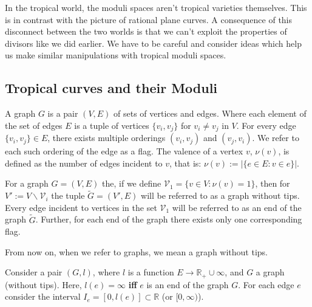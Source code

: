 \par In the tropical world, the moduli spaces aren't tropical varieties themselves. 
This is in contrast with the picture of rational plane curves.
A consequence of this disconnect between the two worlds is that we can't exploit the properties of divisors like we did earlier.
We have to be careful and consider ideas which help us make similar manipulations with tropical moduli spaces.

\subsection{Tropical curves and their Moduli}

\begin{definition}[Graphs]
    A graph $G$ is a pair $(V,E)$ of sets of vertices and edges.
    Where each element of the set of edges $E$ is a tuple of vertices $\{v_{i},v_{j}\}$ for $v_{i} \neq v_{j}$ in $V$. 
    For every edge $\{v_{i},v_{j}\} \in E$, there exists multiple orderings $(v_{i},v_{j})$ and $(v_{j},v_{i})$. We refer to each such ordering of the edge as a flag.
    The valence of a vertex $v$, $\nu(v)$, is defined as the number of edges incident to $v$, that is: $\nu(v):=|\{e \in E: v\in e\}|$.
\end{definition}

\begin{definition}
    For a graph $G = (V,E)$ the, if we define $\mathcal{V}_{1} = \{v \in V: \nu(v) =1  \}$, then for $V':= V\backslash \mathcal{V}_{i}$ the tuple $\tilde{G} = (V',E)$ will be referred to as a graph without tips. 
    Every edge incident to vertices in the set $\mathcal{V}_{1}$ will be referred to as an end of the graph $\tilde G$.
    Further, for each end of the graph there exists only one corresponding flag.
\end{definition}

\begin{remark}
    From now on, when we refer to graphs, we mean a graph without tips.
\end{remark}

\begin{definition}
    Consider a pair $(G,l)$, where $l$ is a function $E \to \mathbb{R}_{+} \cup \infty$, and $G$ a graph (without tips).
    Here, $l(e) = \infty$ \textbf{iff} $e$ is an end of the graph $G$.
For each edge $e$ consider the interval $I_{e} = [0,l(e)]\subset \mathbb{R}$ (or $[0,\infty)$).
\end{definition}

